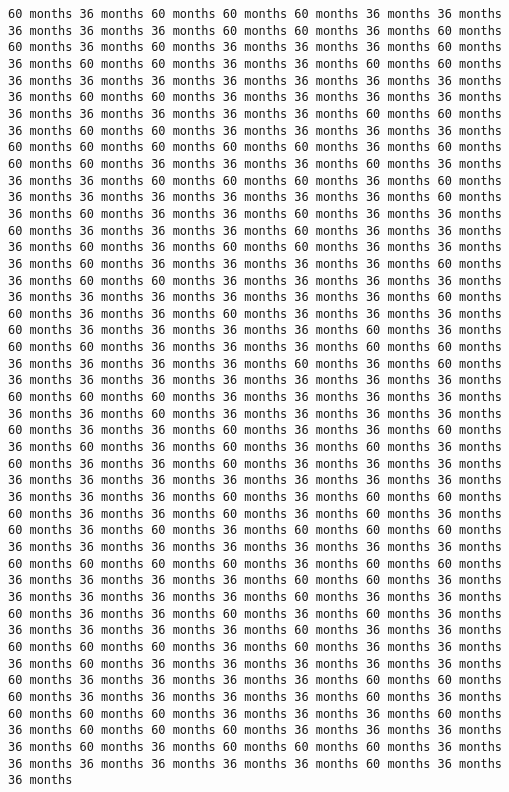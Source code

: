 \documentclass[11pt]{article}
\begin{document}
\begin{Verbatim}[commandchars=\\\{\}, frame=single, framerule=2mm, rulecolor=\color{outerrorbackground}]
60 months 36 months 60 months 60 months 60 months 36 months 36 months 36 months 36 months 36 months 60 months 60 months 36 months 60 months 60 months 36 months 60 months 36 months 36 months 36 months 60 months 36 months 60 months 60 months 36 months 36 months 60 months 60 months 36 months 36 months 36 months 36 months 36 months 36 months 36 months 36 months 60 months 60 months 36 months 36 months 36 months 36 months 36 months 36 months 36 months 36 months 36 months 60 months 60 months 36 months 60 months 60 months 36 months 36 months 36 months 36 months 60 months 60 months 60 months 60 months 60 months 36 months 60 months 60 months 60 months 36 months 36 months 36 months 60 months 36 months 36 months 36 months 60 months 60 months 60 months 36 months 60 months 36 months 36 months 36 months 36 months 36 months 36 months 60 months 36 months 60 months 36 months 36 months 60 months 36 months 36 months 60 months 36 months 36 months 36 months 60 months 36 months 36 months 36 months 60 months 36 months 60 months 60 months 36 months 36 months 36 months 60 months 36 months 36 months 36 months 36 months 60 months 36 months 60 months 60 months 36 months 36 months 36 months 36 months 36 months 36 months 36 months 36 months 36 months 36 months 60 months 60 months 36 months 36 months 60 months 36 months 36 months 36 months 60 months 36 months 36 months 36 months 36 months 60 months 36 months 60 months 60 months 36 months 36 months 36 months 60 months 60 months 36 months 36 months 36 months 36 months 60 months 36 months 60 months 36 months 36 months 36 months 36 months 36 months 36 months 36 months 60 months 60 months 60 months 36 months 36 months 36 months 36 months 36 months 36 months 60 months 36 months 36 months 36 months 36 months 60 months 36 months 36 months 60 months 36 months 36 months 60 months 36 months 60 months 36 months 60 months 36 months 60 months 36 months 60 months 36 months 36 months 60 months 36 months 36 months 36 months 36 months 36 months 36 months 36 months 36 months 36 months 36 months 36 months 36 months 36 months 60 months 36 months 60 months 60 months 60 months 36 months 36 months 60 months 36 months 60 months 36 months 60 months 36 months 60 months 36 months 60 months 60 months 60 months 36 months 36 months 36 months 36 months 36 months 36 months 36 months 60 months 60 months 60 months 60 months 36 months 60 months 60 months 36 months 36 months 36 months 36 months 60 months 60 months 36 months 36 months 36 months 36 months 36 months 60 months 36 months 36 months 60 months 36 months 36 months 60 months 36 months 60 months 36 months 36 months 36 months 36 months 36 months 60 months 36 months 36 months 60 months 60 months 60 months 36 months 60 months 36 months 36 months 36 months 60 months 36 months 36 months 36 months 36 months 36 months 60 months 36 months 36 months 36 months 36 months 60 months 60 months 60 months 36 months 36 months 36 months 36 months 60 months 36 months 60 months 60 months 60 months 36 months 36 months 36 months 60 months 36 months 60 months 60 months 60 months 36 months 36 months 36 months 36 months 60 months 36 months 60 months 60 months 60 months 36 months 36 months 36 months 36 months 36 months 36 months 60 months 36 months 36 months 
\end{Verbatim}
\end{document}
